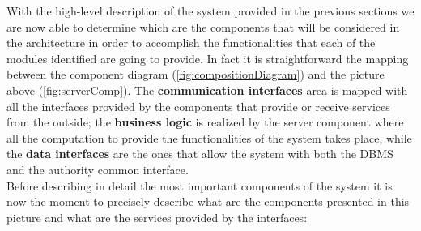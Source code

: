 		With the high-level description of the system provided in the previous sections we are now able to determine which are the components that will be considered in the architecture in order to accomplish the functionalities that each of the modules identified are going to provide. In fact it is straightforward the mapping between the component diagram (\autoref{fig:compositionDiagram}) and the picture above (\autoref{fig:serverComp}). The \textbf{communication interfaces} area is mapped with all the interfaces provided by the components that provide or receive services from the outside; the \textbf{business logic} is realized by the server component where all the computation to provide the functionalities of the system takes place, while the \textbf{data interfaces} are the ones that allow the system with both the DBMS and the authority common interface.\\
		
		Before describing in detail the most important components of the system it is now the moment to precisely describe what are the components presented in this picture and what are the services provided by the interfaces:
		
